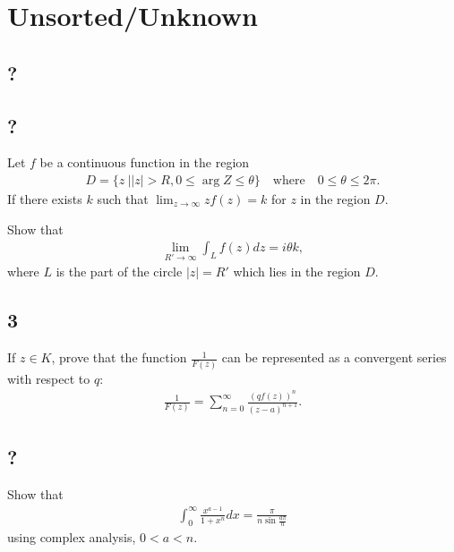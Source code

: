 \hypertarget{unsortedunknown}{%
\section{Unsorted/Unknown}\label{unsortedunknown}}

\hypertarget{section-12}{%
\subsection{?}\label{section-12}}

\hypertarget{section-13}{%
\subsection{?}\label{section-13}}

Let \(f\) be a continuous function in the region
\begin{align*}
D=\{z\ |  |z|>R, 0\leq \arg Z\leq \theta\}\quad\text{where}\quad 0\leq \theta \leq 2\pi
.\end{align*}
If there exists \(k\) such that
\(\displaystyle{\lim_{z\to\infty} zf(z)=k}\) for \(z\) in the region
\(D\).

Show that
\begin{align*}\lim_{R'\to\infty} \int_{L} f(z) dz=i\theta k,\end{align*}
where \(L\) is the part of the circle \(|z|=R'\) which lies in the
region \(D\).

\hypertarget{section-14}{%
\subsection{3}\label{section-14}}

If \(z\in K\), prove that the function \(\displaystyle{\frac{1}{F(z)}}\)
can be represented as a convergent series with respect to \(q\):
\begin{align*}
\displaystyle{
\frac{1}{F(z)}=\sum_{n=0}^{\infty} \frac{(qf(z))^n}{(z-a)^{n+1}}.}\end{align*}

\hypertarget{section-15}{%
\subsection{?}\label{section-15}}

Show that
\begin{align*}
\displaystyle \int_0^\infty \frac{x^{a-1}}{1+x^n} dx=\frac{\pi}{n\sin \frac{a\pi}{n}}
\end{align*}
using complex analysis, \(0< a < n\).

